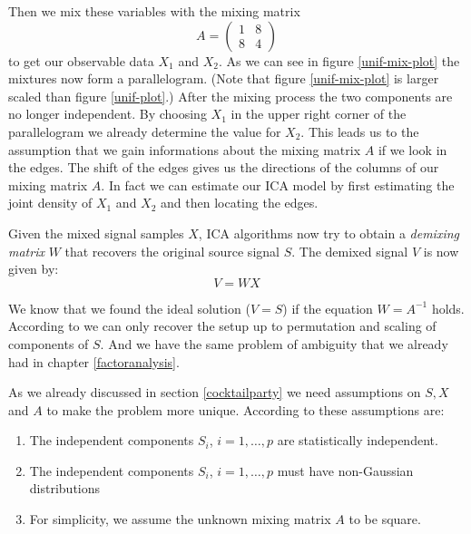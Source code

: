 \documentclass[12pt, a4paper]{article}
\numberwithin{equation}{section}
\numberwithin{figure}{section}
\numberwithin{table}{section}
\begin{document}
	Then we mix these variables with the mixing matrix
	\begin{equation}
	A=
	\begin{pmatrix}
	1 & 8 \\
	8 & 4
	\end{pmatrix}
	\end{equation}
	to get our observable data \mbox{$X_1$} and \mbox{$X_2$}.
	As we can see in figure \ref{unif-mix-plot} the mixtures now form a parallelogram. (Note that figure \ref{unif-mix-plot} is larger scaled than figure \ref{unif-plot}.)
	After the mixing process the two components are no longer independent.
	By choosing \mbox{$X_1$} in the upper right corner of the parallelogram we already determine the value for \mbox{$X_2$}.
	This leads us to the assumption that we gain informations about the mixing matrix $A$ if we look in the edges.
	The shift of the edges gives us the directions of the columns of our mixing matrix $A$.
	In fact we can estimate our ICA model by first estimating the joint density of \mbox{$X_1$} and \mbox{$X_2$} and then locating the edges.
	
	
	
	Given the mixed signal samples $X$,  ICA algorithms now try to obtain a \textit{demixing matrix} $W$ that recovers the original source signal $S$. The demixed signal $V$ is now given by:
	\begin{equation}
	V = WX
	\end{equation}
	
	We know that we found the ideal solution \mbox{($V = S$)} if the equation \mbox{$W=A^{-1}$} holds.
	According to \citet{estimating-smi-ica} we can only recover the setup up to permutation and scaling of components of $S$. 
	And we have the same problem of ambiguity that we already had in chapter \ref{factoranalysis}.\\ %
	
	\begin{minipage}{\textwidth}
		As we already discussed in section \ref{cocktailparty} we need assumptions on \mbox{$S, X$} and \mbox{$A$} to make the problem more unique. According to \citet{ICA_Book} these assumptions are:
		\begin{enumerate}
			\item The independent components $S_i$, $ i=1,\dots,p$ are statistically independent.
			\item The independent components $S_i$, $ i=1,\dots,p$ must have non-Gaussian \linebreak distributions
			\item For simplicity, we assume the unknown mixing matrix $A$ to be square.
		\end{enumerate}
	\end{minipage}\\~\\
	
\end{document}
